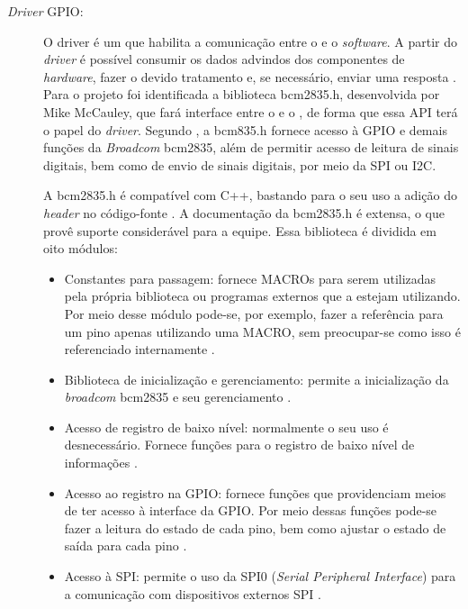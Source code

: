 \begin{description}
\item[\textit{Driver} GPIO:] O driver é um \software que habilita a comunicação
entre o \hardware e o \textit{software}. A partir do \textit{driver} é possível consumir os
dados advindos dos componentes de \textit{hardware}, fazer o devido tratamento e, se
necessário, enviar uma resposta \cite{windows2016}. Para o projeto foi
identificada a biblioteca \textsf{bcm2835.h}, desenvolvida por Mike McCauley,
que fará interface entre o \hardware e o \middleware, de forma que essa API
terá o papel do \textit{driver}. Segundo , a
\textsf{bcm835.h} fornece acesso à GPIO e demais funções da \textit{Broadcom}
bcm2835, além de permitir acesso de leitura de sinais digitais, bem como de
envio de sinais digitais, por meio da SPI ou I2C.
\par
A \textsf{bcm2835.h} é compatível com C++, bastando para o seu uso a adição do
\textit{header} no código-fonte \cite{mccauley2015}. A documentação da
\textsf{bcm2835.h} é extensa, o que provê suporte considerável para a equipe.
Essa biblioteca é dividida em oito módulos:
\begin{itemize}
  \item Constantes para passagem: fornece \textsf{MACROs} para serem utilizadas
  pela própria biblioteca ou programas externos que a estejam utilizando. Por
  meio desse módulo pode-se, por exemplo, fazer a referência para um pino apenas
  utilizando uma \textsf{MACRO}, sem preocupar-se como isso é referenciado
  internamente \cite{mccauley2015}.
  
  \item Biblioteca de inicialização e gerenciamento: permite a inicialização da
  \textit{broadcom} bcm2835 e seu gerenciamento \cite{mccauley2015}.
  
  \item Acesso de registro de baixo nível: normalmente o seu uso é desnecessário.
  Fornece funções para o registro de baixo nível de informações \cite{mccauley2015}.
  
  \item  Acesso ao registro na GPIO: fornece funções que providenciam meios de ter
  acesso à interface da GPIO. Por meio dessas funções pode-se fazer a leitura do
  estado de cada pino, bem como ajustar o estado de saída para cada pino
  \cite{mccauley2015}.
  
  \item Acesso à SPI: permite o uso da SPI0 (\textit{Serial Peripheral Interface})
  para a comunicação com dispositivos externos SPI \cite{mccauley2015}.
  

\end{itemize}
\end{description}
